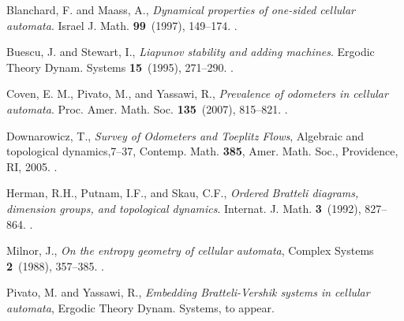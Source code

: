 \documentclass[12pt]{amsart}
\begin{document}
\begin{thebibliography}{3}

		Blanchard, F. and Maass, A.,
		\emph{Dynamical properties of one-sided cellular automata}.
			Israel J. Math.
			\textbf{99}~(1997), 149--174.
	.

		Buescu, J. and Stewart, I.,
		\emph{Liapunov stability and adding machines}.
			Ergodic Theory Dynam. Systems
			\textbf{15}~(1995), 271--290.
	.

	Coven, E. M., Pivato, M., and  Yassawi, R.,
	\emph{Prevalence of odometers in cellular automata}.
	Proc. Amer. Math. Soc.
	\textbf{135}~(2007), 815--821.
	.
	

	Downarowicz, T.,
	\emph{Survey of Odometers and Toeplitz Flows}, 
	Algebraic and topological dynamics,7--37,
	Contemp. Math. \textbf{385},
	Amer. Math. Soc., Providence, RI, 2005.
	 	.
		
	Herman, R.H., Putnam, I.F., and Skau, C.F.,
	\emph{Ordered Bratteli diagrams, dimension groups, and topological dynamics}.
	Internat. J. Math.
	\textbf{3}~(1992), 827--864.
	.

	Milnor, J.,
	\emph{On the entropy geometry of cellular automata},
	Complex Systems
	\textbf{2}~(1988), 357--385.
	.
	
	Pivato, M. and Yassawi, R.,
	\emph{Embedding Bratteli-Vershik systems in cellular automata},
	Ergodic Theory Dynam. Systems,
	to appear.

	              

		
  
\end{thebibliography}
\end{document}
